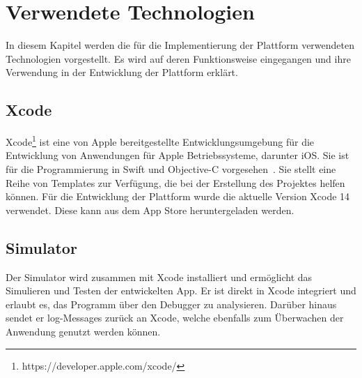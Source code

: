     \chapter{Verwendete Technologien}\label{ch:verwendete-technologien}
    In diesem Kapitel werden die für die Implementierung der Plattform verwendeten Technologien vorgestellt.
    Es wird auf deren Funktionsweise eingegangen und ihre Verwendung in der Entwicklung der Plattform erklärt.


    \section{Xcode}\label{sec:xcode}
    Xcode\footnote{https://developer.apple.com/xcode/} ist eine von Apple bereitgestellte Entwicklungsumgebung für die Entwicklung von Anwendungen für Apple Betriebssysteme, darunter iOS.
    Sie ist für die Programmierung in Swift und Objective-C vorgesehen~\cite{xcode}.
    Sie stellt eine Reihe von Templates zur Verfügung, die bei der Erstellung des Projektes helfen können.
    Für die Entwicklung der Plattform wurde die aktuelle Version Xcode 14 verwendet.
    Diese kann aus dem App Store heruntergeladen werden.

    \section{Simulator}\label{sec:simulator}
    Der Simulator wird zusammen mit Xcode installiert und ermöglicht das Simulieren und Testen der entwickelten App.
    Er ist direkt in Xcode integriert und erlaubt es, das Programm über den Debugger zu analysieren.
    Darüber hinaus sendet er log-Messages zurück an Xcode, welche ebenfalls zum Überwachen der Anwendung genutzt werden können.


%
%
%



